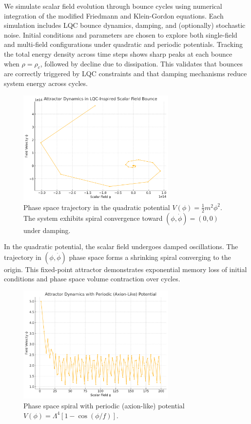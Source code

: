 \documentclass[12pt]{article}
\begin{document}
We simulate scalar field evolution through bounce cycles using numerical integration of the modified Friedmann and Klein-Gordon equations. Each simulation includes LQC bounce dynamics, damping, and (optionally) stochastic noise. Initial conditions and parameters are chosen to explore both single-field and multi-field configurations under quadratic and periodic potentials. Tracking the total energy density across time steps shows sharp peaks at each bounce when $\rho = \rho_c$, followed by decline due to dissipation. This validates that bounces are correctly triggered by LQC constraints\cite{Ashtekar2006} and that damping mechanisms reduce system energy across cycles.


\begin{figure}[h]
  \centering
  \includegraphics[width=0.7\textwidth]{figures/quadratic_attractor.png}
  \caption{Phase space trajectory in the quadratic potential $V(\phi) = \frac{1}{2}m^2\phi^2$. The system exhibits spiral convergence toward $(\phi, \dot{\phi}) = (0, 0)$ under damping.}
\end{figure}

In the quadratic potential, the scalar field undergoes damped oscillations. The trajectory in $(\phi, \dot{\phi})$ phase space forms a shrinking spiral converging to the origin. This fixed-point attractor demonstrates exponential memory loss of initial conditions and phase space volume contraction over cycles.

\begin{figure}[h]
  \centering
  \includegraphics[width=0.7\textwidth]{figures/periodic_attractor.png}
  \caption{Phase space spiral with periodic (axion-like) potential $V(\phi) = \Lambda^4[1 - \cos(\phi/f)]$.}
\end{figure}
\end{document}
